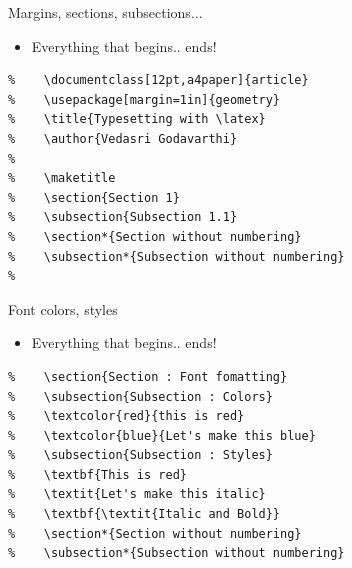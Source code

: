 \begin{frame}[fragile]{Margins, sections, subsections...}
\begin{itemize}
    \item Everything that begins.. ends!
\end{itemize}
\begin{verbatim}
%    \documentclass[12pt,a4paper]{article} 
%    \usepackage[margin=1in]{geometry}
%    \title{Typesetting with \latex}
%    \author{Vedasri Godavarthi}
%     
%    \maketitle
%    \section{Section 1}
%    \subsection{Subsection 1.1}
%    \section*{Section without numbering}
%    \subsection*{Subsection without numbering}
%    
\end{verbatim}
\end{frame}

\begin{frame}[fragile]{Font colors, styles}
\begin{itemize}
    \item Everything that begins.. ends!
\end{itemize}
\begin{verbatim}
%    \section{Section : Font fomatting}
%    \subsection{Subsection : Colors}
%    \textcolor{red}{this is red}
%    \textcolor{blue}{Let's make this blue}
%    \subsection{Subsection : Styles}
%    \textbf{This is red}
%    \textit{Let's make this italic}
%    \textbf{\textit{Italic and Bold}}
%    \section*{Section without numbering}
%    \subsection*{Subsection without numbering}
\end{verbatim}
\end{frame}


